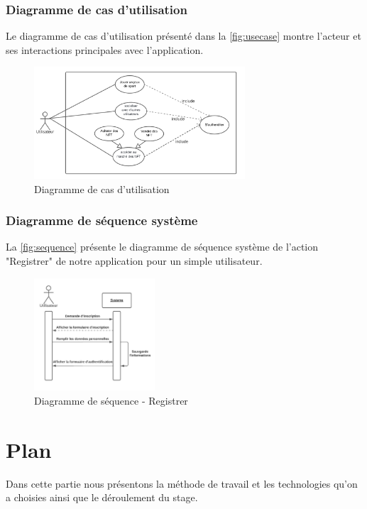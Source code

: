 \documentclass[12pt,a4paper,oneside,french]{book}
\begin{document}
\subsubsection*{Diagramme de cas d’utilisation}
Le diagramme de cas d’utilisation présenté dans la \autoref{fig:usecase} montre l’acteur et ses
interactions principales avec l’application.

\begin{figure}[H]
    \centering
    \includegraphics[width=0.7\textwidth]{figure/usecase.png}
    \caption{Diagramme de cas d’utilisation}
    \label{fig:usecase}
\end{figure}
\noindent

\subsubsection*{Diagramme de séquence système}
La \autoref{fig:sequence} présente le diagramme de séquence système de l'action "Registrer" de notre application pour un simple utilisateur.

\begin{figure}[H]
    \centering
    \includegraphics[width=0.4\textwidth]{figure/sequence.png}
    \caption{Diagramme de séquence - Registrer}
    \label{fig:sequence}
\end{figure}
\noindent


\section{Plan}
Dans cette partie nous présentons la méthode de travail et les technologies qu'on a choisies ainsi que le déroulement du stage.
\end{document}
